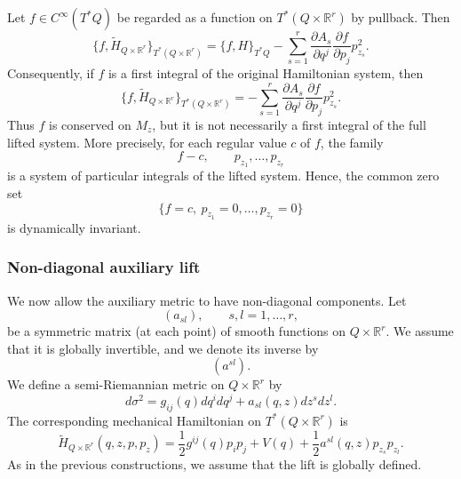 \documentclass[10pt,a4paper]{article}
\begin{document}
Let \(f\in C^\infty(T^*Q)\) be regarded as a function on \(T^*(Q\times\mathbb R^r)\) by pullback. Then
\begin{equation*}
\{f,\widetilde H_{Q\times\mathbb R^r}\}_{T^*(Q\times\mathbb R^r)}
=
\{f,H\}_{T^*Q}
-
\sum_{s=1}^{r}
\frac{\partial A_s}{\partial q^j}
\frac{\partial f}{\partial p_j}
p_{z_s}^{2}.
\end{equation*}
Consequently, if \(f\) is a first integral of the original Hamiltonian system, then
\begin{equation*}
\{f,\widetilde H_{Q\times\mathbb R^r}\}_{T^*(Q\times\mathbb R^r)}
=
-
\sum_{s=1}^{r}
\frac{\partial A_s}{\partial q^j}
\frac{\partial f}{\partial p_j}
p_{z_s}^{2}.
\end{equation*}
Thus \(f\) is conserved on \(M_z\), but it is not necessarily a first integral of the full lifted system. More precisely, for each regular value \(c\) of \(f\), the family
\[
f-c,\qquad p_{z_1},\ldots,p_{z_r}
\]
is a system of particular integrals of the lifted system. Hence, the common zero set
\[
\{f=c,\ p_{z_1}=0,\ldots,p_{z_r}=0\}
\]
is dynamically invariant.


\subsubsection{Non-diagonal auxiliary lift}

We now allow the auxiliary metric to have non-diagonal components. Let
\[
(a_{sl}),\qquad s,l=1,\ldots,r,
\]
be a symmetric matrix (at each point) of smooth functions on \(Q\times\mathbb R^r\). We assume that it is globally invertible, and we denote its inverse by
\[
(a^{sl}).
\]
We define a semi-Riemannian metric on \(Q\times\mathbb R^r\) by
\begin{equation*}
d\sigma^2
=
g_{ij}(q)dq^idq^j
+
a_{sl}(q,z)dz^s dz^l.
\end{equation*}
The corresponding mechanical Hamiltonian on \(T^*(Q\times\mathbb R^r)\) is
\begin{equation*}
\widetilde H_{Q\times\mathbb R^r}(q,z,p,p_z)
=
\frac{1}{2}g^{ij}(q)p_ip_j
+
V(q)
+
\frac{1}{2}a^{sl}(q,z)p_{z_s}p_{z_l}.
\end{equation*}
As in the previous constructions, we assume that the lift is globally defined.
\end{document}
